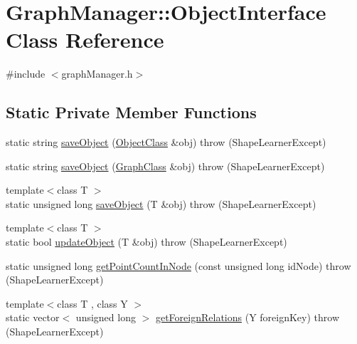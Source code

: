 \hypertarget{class_graph_manager_1_1_object_interface}{}\section{Graph\+Manager\+:\+:Object\+Interface Class Reference}
\label{class_graph_manager_1_1_object_interface}


{\ttfamily \#include $<$graph\+Manager.\+h$>$}

\subsection*{Static Private Member Functions}
\begin{DoxyCompactItemize}
\item 
static string \hyperlink{class_graph_manager_1_1_object_interface_a0cbc778a3668c29ed8ba86586d892711}{save\+Object} (\hyperlink{class_object_class}{Object\+Class} \&obj)  throw (\+Shape\+Learner\+Except)
\item 
static string \hyperlink{class_graph_manager_1_1_object_interface_af139f0b342ea0d466dcc31f89c4ea88e}{save\+Object} (\hyperlink{class_graph_class}{Graph\+Class} \&obj)  throw (\+Shape\+Learner\+Except)
\item 
{\footnotesize template$<$class T $>$ }\\static unsigned long \hyperlink{class_graph_manager_1_1_object_interface_a7f6d0fb21c9a85be728416bd1a11bf68}{save\+Object} (T \&obj)  throw (\+Shape\+Learner\+Except)
\item 
{\footnotesize template$<$class T $>$ }\\static bool \hyperlink{class_graph_manager_1_1_object_interface_a32eafc57f62fac55ea61a678e768f66a}{update\+Object} (T \&obj)  throw (\+Shape\+Learner\+Except)
\item 
static unsigned long \hyperlink{class_graph_manager_1_1_object_interface_a01d3fb7182ab7b1c2370d0b4e0b32981}{get\+Point\+Count\+In\+Node} (const unsigned long id\+Node)  throw (\+Shape\+Learner\+Except)
\item 
{\footnotesize template$<$class T , class Y $>$ }\\static vector$<$ unsigned long $>$ \hyperlink{class_graph_manager_1_1_object_interface_a05673a4e25d664c9c1999390f81452c7}{get\+Foreign\+Relations} (Y foreign\+Key)  throw (\+Shape\+Learner\+Except)
\end{DoxyCompactItemize}
